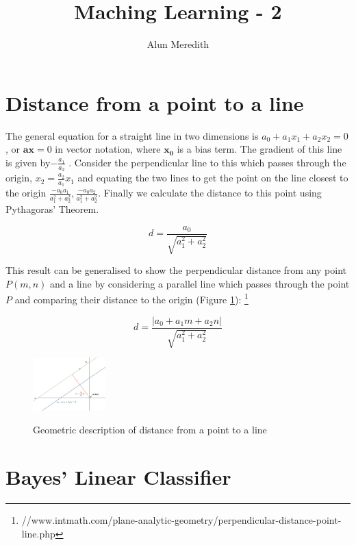 \documentclass[a4paper,11pt, twocolumn]{article}
\author{Alun Meredith}
\title{Maching Learning - 2}
\begin{document}
\maketitle

\section{Distance from a point to a line}

The general equation for a straight line in two dimensions is $a_0 + a_1x_1 + a_2x_2 = 0$, or $\mathbf{ax}=0$ in vector notation, where $\mathbf{x_0}$ is a bias term. The gradient of this line is given by$ -\frac{a_1}{a_2} $ . Consider the perpendicular line to this which passes through the origin, $x_2 = \frac{a_2}{a_1}x_1$ and equating the two lines to get the point on the line closest to the origin $\frac{-a_0a_1}{a_1^2+a_2^2}, \frac{-a_0a_2}{a_1^2+a_2^2}$. Finally we calculate the distance to this point using Pythagoras' Theorem.
 
\begin{equation}
	d = \frac{a_0}{\sqrt{a_1^2+a_2^2}}
\end{equation} 

This result can be generalised to show the perpendicular distance from any point $P(m,n)$ and a line by considering a parallel line which passes through the point $P$ and comparing their distance to the origin (Figure \ref{fig:diagram1}): \footnote{//www.intmath.com/plane-analytic-geometry/perpendicular-distance-point-line.php} 

\begin{equation}
d = \frac{|a_0+a_1m+a_2n|}{\sqrt{a_1^2+a_2^2}}
\end{equation}  

\begin{figure}
\caption{Geometric description of distance from a point to a line}
\includegraphics[width=0.25\textwidth]{diagram2.jpg}
\label{fig:diagram1}
\end{figure}

\section{Bayes' Linear Classifier}
\end{document}
